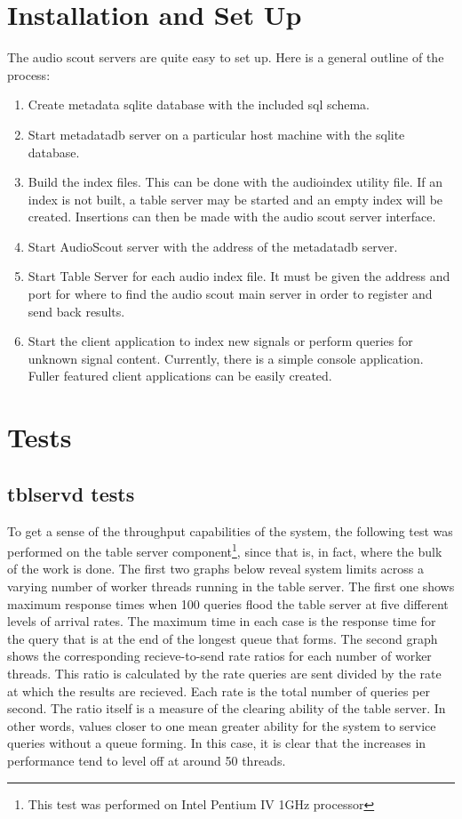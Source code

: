 \documentclass[11pt, a4paper]{article}
\begin{document}
\section{Installation and Set Up}
The audio scout servers are quite easy to set up.  Here is a general outline of the process:
\begin{enumerate}
\item Create metadata sqlite database with the included sql schema.  
\item Start metadatadb server on a particular host machine with the sqlite database. 
\item Build the index files. This can be done with the audioindex utility file.  If an index is 
not built, a table server may be started and an empty index will be created.  
Insertions can then be made with the audio scout server interface.  
\item Start AudioScout server with the address of the metadatadb server.
\item Start Table Server for each audio index file. It must be given the address and port for
where to find the audio scout main server in order to register and send back results.  
\item Start the client application to index new signals or perform queries for unknown signal
content. Currently, there is a simple console application. Fuller featured client applications
can be easily created.
\end{enumerate}

\section{Tests}

\subsection{tblservd tests}
To get a sense of the throughput capabilities of the system, the following test was performed 
on the table server component\footnote{This test was performed on Intel Pentium IV 1GHz 
processor}, since that is, in fact, where the bulk of the work is done.  
The first two graphs below reveal system limits across a varying number of worker threads running 
in the table server. The first one shows maximum response times when 100 queries flood the table 
server at five different levels of arrival rates.  The maximum time in each case is the response time for 
the query that is at the end of the longest queue that forms.  The second graph shows the 
corresponding recieve-to-send rate ratios for each number of worker threads.  This ratio is 
calculated by the rate queries are sent divided by the rate at which the results are recieved.  
Each rate is the total number of queries per second. The ratio itself is a measure of the 
clearing ability of the table server. In other words, values closer to one mean greater ability 
for the system to service queries without a queue forming. In this case,  it is clear that 
the increases in performance tend to level off at around 
50 threads.
 
\end{document}
